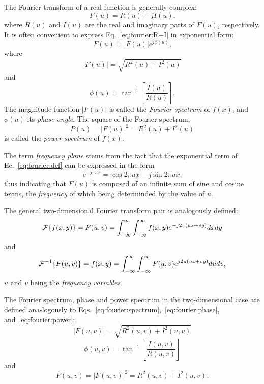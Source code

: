 The Fourier transform of a real function is generally complex:
\begin{equation}
\label{eq:fourier:R+I}
  F(u)=R(u)+jI(u)\mbox{,}
\end{equation}
where $R(u)$ and $I(u)$ are the real and imaginary parts of $F(u)$,
respectively.  It is often convenient to express
Eq.~\ref{eq:fourier:R+I} in exponential form:
\begin{equation}
  F(u)=|F(u)|e^{j\phi(u)}\mbox{,}
\end{equation}
where
\begin{equation}
\label{eq:fourier:spectrum}
  |F(u)|=\sqrt{R^{2}(u)+I^{2}(u)}
\end{equation}
and
\begin{equation}
\label{eq:fourier:phase}
  \phi(u)=\tan^{-1}\left[\frac{I(u)}{R(u)}\right]\mbox{.}
\end{equation}
The magnitude function $|F(u)|$ is called the {\em Fourier spectrum\/}
of $f(x)$, and $\phi(u)$ its {\em phase angle\/}.  The square of the
Fourier spectrum,
\begin{equation}
\label{eq:fourier:power}
  P(u)=|F(u)|^{2}=R^{2}(u)+I^{2}(u)
\end{equation}
is called the {\em power spectrum\/} of $f(x)$.

The term {\em frequency plane\/} stems from the fact that the
exponential term of Ec.~\ref{eq:fourier:def} can be expressed in the
form
\begin{equation}
  e^{-j\pi ux}=\cos 2\pi ux-j\sin 2\pi ux\mbox{,}
\end{equation}
thus indicating that $F(u)$ is composed of an infinite sum of sine and
cosine terms, the {\em frequency\/} of which being determinded by the
value of $u$.

The general two-dimensional Fourier transform pair is analogously
defined:
\begin{equation}
  {\cal F}\{f(x,y)\}=F(u,v)=\int_{-\infty}^{\infty}
  \int_{-\infty}^{\infty}f(x,y)e^{-j2\pi(ux+vy)}dxdy
\end{equation}
and
\begin{equation}
  {\cal F}^{-1}\{F(u,v)\}=f(x,y)=\int_{-\infty}^{\infty}
  \int_{-\infty}^{\infty}F(u,v)e^{j2\pi(ux+vy)}dudv\mbox{,}
\end{equation}
$u$ and $v$ being the {\em frequency variables\/}.

The Fourier spectrum, phase and power spectrum in the two-dimensional
case are defined ana-logously to
Eqs.~\ref{eq:fourier:spectrum},~\ref{eq:fourier:phase},
and~\ref{eq:fourier:power}:
\begin{equation}
\label{eq:fourier:spectrum2}
  |F(u,v)|=\sqrt{R^{2}(u,v)+I^{2}(u,v)}
\end{equation}
\begin{equation}
\label{eq:fourier:phase2}
  \phi(u,v)=\tan^{-1}\left[\frac{I(u,v)}{R(u,v)}\right]
\end{equation}
and
\begin{equation}
\label{eq:fourier:power2}
  P(u,v)=|F(u,v)|^{2}=R^{2}(u,v)+I^{2}(u,v)\mbox{.}
\end{equation}

